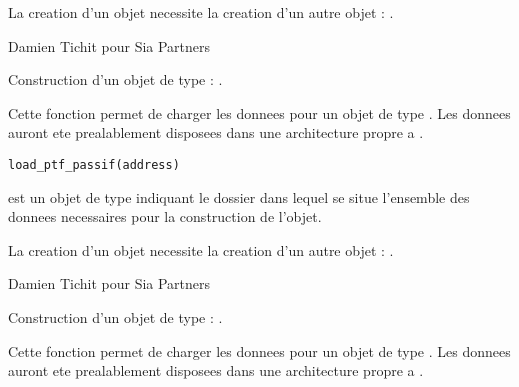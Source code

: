 \documentclass[a4paper]{book}
\begin{document}
%
\begin{Details}\relax
La creation d'un objet  necessite la creation d'un autre objet : .
\end{Details}
%
\begin{Author}\relax
Damien Tichit pour Sia Partners
\end{Author}
%
\begin{SeeAlso}\relax
Construction d'un objet de type  : .
\end{SeeAlso}
%
\begin{Description}\relax
Cette fonction permet de charger les donnees pour un objet de type . Les donnees auront ete prealablement disposees dans
une architecture propre a .
\end{Description}
%
\begin{Usage}
\begin{verbatim}
load_ptf_passif(address)
\end{verbatim}
\end{Usage}
%
\begin{Arguments}
\begin{ldescription}
\item[\code{address}] est un objet de type  indiquant le dossier dans lequel se situe l'ensemble des donnees necessaires
pour la construction de l'objet.
\end{ldescription}
\end{Arguments}
%
\begin{Details}\relax
La creation d'un objet  necessite la creation d'un autre objet : .
\end{Details}
%
\begin{Author}\relax
Damien Tichit pour Sia Partners
\end{Author}
%
\begin{SeeAlso}\relax
Construction d'un objet de type  : .
\end{SeeAlso}
%
\begin{Description}\relax
Cette fonction permet de charger les donnees pour un objet de type . Les donnees auront ete prealablement disposees dans
une architecture propre a .
\end{Description}
\end{document}
